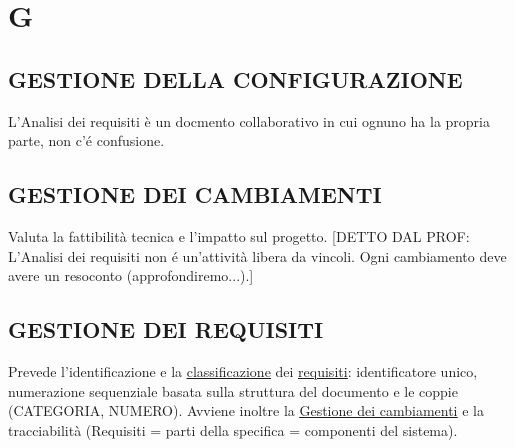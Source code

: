 \newpage
	\section{G} \label{sec:G}
		\subsection{GESTIONE DELLA CONFIGURAZIONE}  \label{gestioneconfigurazione}
		L'Analisi dei requisiti è un docmento collaborativo in cui ognuno ha la propria parte, non c'é confusione.
		
		\subsection{GESTIONE DEI CAMBIAMENTI}  \label{gestionecambiamenti}
		Valuta la fattibilità tecnica e l'impatto sul progetto.
		[DETTO DAL PROF: L'Analisi dei requisiti non é un'attività libera da vincoli. Ogni cambiamento deve avere un resoconto (approfondiremo...).]
		
		\subsection{GESTIONE DEI REQUISITI}	 \label{gestionerequisiti}
		Prevede l'identificazione e la \underline{\hyperref[classificazione]{classificazione}} dei \underline{\hyperref[requirements]{requisiti}}: identificatore unico, numerazione sequenziale basata sulla struttura del documento e le coppie (CATEGORIA, NUMERO). Avviene inoltre la \underline{\hyperref[gestionecambiamenti]{Gestione dei cambiamenti}} e la tracciabilità (Requisiti = parti della specifica = componenti del sistema).
		
